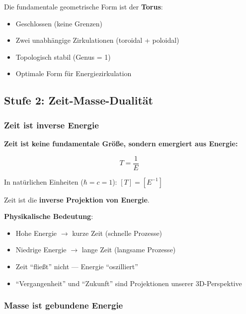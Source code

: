 	Die fundamentale geometrische Form ist der \textbf{Torus}:
	\begin{itemize}
		\item Geschlossen (keine Grenzen)
		\item Zwei unabhängige Zirkulationen (toroidal + poloidal)
		\item Topologisch stabil (Genus = 1)
		\item Optimale Form für Energiezirkulation
	\end{itemize}
	
	\subsection{Stufe 2: Zeit-Masse-Dualität}
	
	\subsubsection{Zeit ist inverse Energie}
	
	\begin{keyresult}
		\textbf{Zeit ist keine fundamentale Größe, sondern emergiert aus Energie:}
		
		\begin{equation}
			\boxed{T = \frac{1}{E}}
		\end{equation}
		
		In natürlichen Einheiten ($\hbar = c = 1$): $[T] = [E^{-1}]$
		
		\vspace{0.3cm}
		
		Zeit ist die \textbf{inverse Projektion von Energie}.
	\end{keyresult}
	
	\textbf{Physikalische Bedeutung}:
	\begin{itemize}
		\item Hohe Energie $\to$ kurze Zeit (schnelle Prozesse)
		\item Niedrige Energie $\to$ lange Zeit (langsame Prozesse)
		\item Zeit \enquote{fließt} nicht — Energie \enquote{oszilliert}
		\item \enquote{Vergangenheit} und \enquote{Zukunft} sind Projektionen unserer 3D-Perspektive
	\end{itemize}
	
	\subsubsection{Masse ist gebundene Energie}
	
